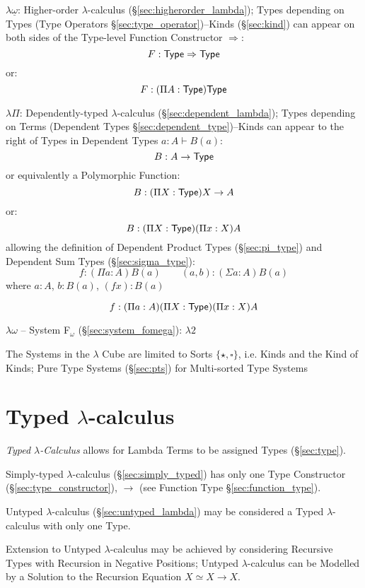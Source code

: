 $\lambda\underline{\omega}$: Higher-order $\lambda$-calculus
(\S\ref{sec:higherorder_lambda}); Types depending on Types (Type
Operators \S\ref{sec:type_operator})--Kinds (\S\ref{sec:kind}) can
appear on both sides of the Type-level Function Constructor
$\Rightarrow$:
\[
   F:\mathsf{Type} \Rightarrow \mathsf{Type}
\]
or:
\[
  F:(\Pi A:\mathsf{Type}) \mathsf{Type}
\]

$\lambda\Pi$: Dependently-typed $\lambda$-calculus
(\S\ref{sec:dependent_lambda}); Types depending on Terms (Dependent
Types \S\ref{sec:dependent_type})--Kinds can appear to the right of
Types in Dependent Types $a:A \vdash B(a)$:
\[
  B : A \rightarrow \mathsf{Type}
\]
or equivalently a Polymorphic Function:
\[
  B : (\Pi X:\mathsf{Type}) X \rightarrow A
\]
or:
\[
  B : (\Pi X:\mathsf{Type}) (\Pi x:X) A
\]
allowing the definition of Dependent Product Types
(\S\ref{sec:pi_type}) and Dependent Sum Types
(\S\ref{sec:sigma_type}):
\[
  f : (\Pi a:A) B(a) \quad\quad (a,b) : (\Sigma a:A) B(a)
\]
where $a:A$, $b:B(a)$, $(f x):B(a)$

\[
  f : (\Pi a:A) (\Pi X:\mathsf{Type}) (\Pi x:X) A
\]

$\lambda\omega$ -- System F$_\omega$ (\S\ref{sec:system_fomega}): $\lambda2$

\fist The Systems in the $\lambda$ Cube are limited to Sorts
$\{\star,\square\}$, i.e. Kinds and the Kind of Kinds; Pure Type
Systems (\S\ref{sec:pts}) for Multi-sorted Type Systems %



\section{Typed $\lambda$-calculus}\label{sec:typed_lambda}

\emph{Typed $\lambda$-Calculus} allows for Lambda Terms to be assigned
Types (\S\ref{sec:type}).

Simply-typed $\lambda$-calculus (\S\ref{sec:simply_typed}) has only
one Type Constructor (\S\ref{sec:type_constructor}), $\rightarrow$
(see Function Type \S\ref{sec:function_type}).

Untyped $\lambda$-calculus (\S\ref{sec:untyped_lambda}) may be
considered a Typed $\lambda$-calculus with only one Type.

Extension to Untyped $\lambda$-calculus may be achieved by
considering Recursive Types with Recursion in Negative Positions;
Untyped $\lambda$-calculus can be Modelled by a Solution to the
Recursion Equation $X \simeq X \rightarrow X$. \cite{wadler12}

